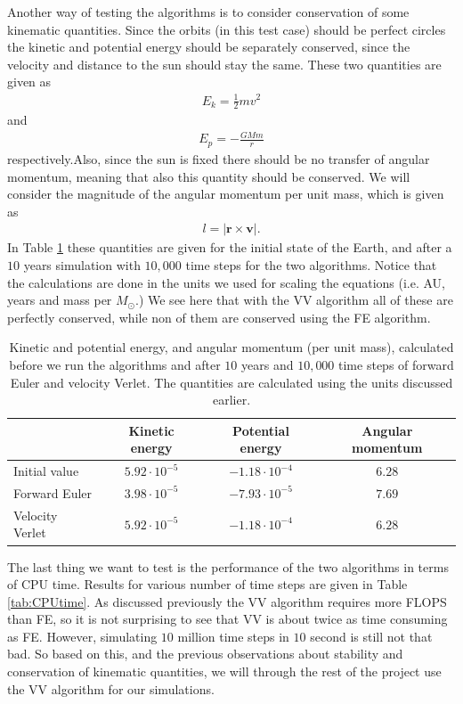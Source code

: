 \documentclass[12pt, a4paper]{article}
\begin{document}
Another way of testing the algorithms is to consider conservation of some kinematic quantities. Since 
the orbits (in this test case) should be perfect circles the kinetic and potential energy should be 
separately conserved, since the velocity and distance to the sun should stay the same.
These two quantities are given as 
\begin{align*}
E_k = \frac{1}{2}mv^2 
\end{align*}
and 
\begin{align*}
E_p = - \frac{GMm}{r}
\end{align*}
respectively.Also, since the sun is fixed there should be no transfer of angular momentum, meaning that
also this quantity should be conserved. We will consider the magnitude of the angular momentum per unit 
mass, which is given as 
\begin{align*}
l = | \mathbf{r} \times \mathbf{v} |. 
\end{align*}
In Table \ref{tab:kinematics} these quantities are given for the initial state of the Earth, 
and after a $10$ years simulation with $10,000$ time steps for the two algorithms.
Notice that the calculations are done in the units we used for scaling the equations (i.e. AU, years and 
mass per $M_{\odot}$.) We see here that 
with the VV algorithm all of these are perfectly conserved, while non of them are conserved 
using the FE algorithm.  

\begin{table}[ht!]
\caption{Kinetic and potential energy, and angular momentum (per unit mass), calculated before we 
run the algorithms and after $10$ years and $10,000$ time steps of forward Euler and velocity Verlet. 
The quantities are calculated using the units discussed earlier.}
\label{tab:kinematics}
\begin{center}
\begin{tabular}{l|ccc}  
		& Kinetic energy & Potential energy & Angular momentum  \\ \hline 
Initial value   & $5.92\cdot10^{-5}$ & $-1.18\cdot10^{-4}$ & $6.28$ \\ 
Forward Euler 	& $3.98\cdot10^{-5}$ & $-7.93\cdot10^{-5}$ & $7.69$ \\ 
Velocity Verlet & $5.92\cdot10^{-5}$ & $-1.18\cdot10^{-4}$ & $6.28$ \\ 	
\end{tabular}
\end{center}
\end{table}

The last thing we want to test is the performance of the two algorithms in terms of CPU time. Results 
for various number of time steps are given in Table \ref{tab:CPUtime}. As discussed previously the 
VV algorithm requires more FLOPS than FE, so it is not surprising to see that VV is about twice as time 
consuming as FE. However, simulating $10$ million time steps in $10$ second is still not that bad. So  
based on this, and the previous observations about stability and conservation of kinematic quantities, 
we will through the rest of the project use the VV algorithm for our simulations.  
\end{document}
